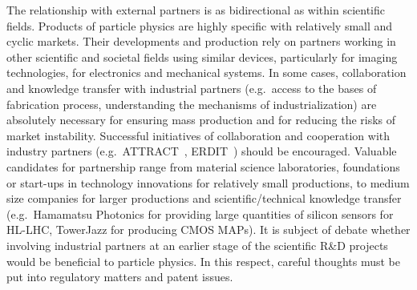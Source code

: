 The relationship with external partners is as bidirectional as within scientific fields. 
Products of particle physics are highly specific with relatively small and cyclic markets. Their developments and production rely on partners working in other scientific and societal fields using similar devices, particularly for imaging technologies, for electronics and mechanical systems. In some cases, collaboration and knowledge transfer with industrial partners (e.g.\ access to the bases of fabrication process, understanding the mechanisms of industrialization) are absolutely necessary for ensuring mass production and for reducing the risks of market instability.
Successful initiatives of collaboration and cooperation with industry partners (e.g.\ ATTRACT~\cite{bib:ATTRACT}, ERDIT~\cite{bib:ERDIT}) should be encouraged.
Valuable candidates for partnership range from material science laboratories, foundations or start-ups in technology innovations for relatively small productions, to medium size companies for larger productions and scientific/technical knowledge transfer (e.g.\ Hamamatsu Photonics for providing large quantities of silicon sensors for HL-LHC, TowerJazz for producing CMOS MAPs).
It is subject of debate whether involving industrial partners at an earlier stage of the scientific R\&D projects would be beneficial to particle physics. In this respect, careful thoughts must be put into regulatory matters and patent issues.

